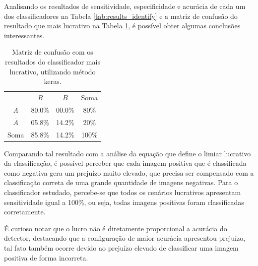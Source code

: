 Analisando os resultados de sensitividade, especificidade e acurácia de cada um dos classificadores na Tabela \ref{tab:results_identify} e a matriz de confusão do resultado que mais lucrativo na Tabela \ref{tab:matriz_de_confusao_best_result}, é possível obter algumas conclusões interessantes.

 \begin{table}[htbp]
     \caption{Matriz de confusão com os resultados do classificador mais lucrativo, utilizando método keras.}
     \label{tab:matriz_de_confusao_best_result}
     \centering
     \begin{tabular}{cccc}\hline\hline
         & \textit{B} & $\overline{B}$ & Soma\\
     \textit{A} & 80.0\% & 00.0\% & 80\% \\
     $\overline{A}$ & 05.8\% & 14.2\% & 20\% \\
     Soma & 85.8\% & 14.2\% & 100\% \\
     \hline\hline
     \end{tabular}
 \end{table}

Comparando tal resultado com a análise da equação que define o limiar lucrativo da classificação, é possível perceber que cada imagem positiva que é classificada como negativa gera um prejuízo muito elevado, que precisa ser compensado com a classificação correta de uma grande quantidade de imagens negativas. Para o classificador estudado, percebe-se que todos os cenários lucrativos apresentam sensitividade igual a 100\%, ou seja, todas imagens positivas foram classificadas corretamente.

É curioso notar que o lucro não é diretamente proporcional a acurácia do detector, destacando que a configuração de maior acurácia apresentou prejuízo, tal fato também ocorre devido ao prejuízo elevado de classificar uma imagem positiva de forma incorreta.